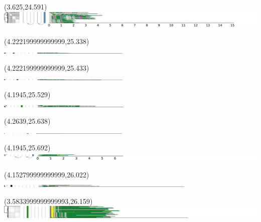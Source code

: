 \documentclass{article}
\begin{document}
\begin{textblock}{13}(3.625,24.591)\includegraphics{latex/figures/haplotypes-constrained/chr15-HG007.pdf}\end{textblock}
\begin{textblock}{13}(4.222199999999999,25.338)\includegraphics{latex/figures/haplotypes-constrained/16qtel_1-500K_1_12_12_rc-HG002.pdf}\end{textblock}
\begin{textblock}{13}(4.222199999999999,25.433)\includegraphics{latex/figures/haplotypes-constrained/16qtel_1-500K_1_12_12_rc-HG003.pdf}\end{textblock}
\begin{textblock}{13}(4.1945,25.529)\includegraphics{latex/figures/haplotypes-constrained/16qtel_1-500K_1_12_12_rc-HG004.pdf}\end{textblock}
\begin{textblock}{13}(4.2639,25.638)\includegraphics{latex/figures/haplotypes-constrained/16qtel_1-500K_1_12_12_rc-HG006.pdf}\end{textblock}
\begin{textblock}{13}(4.1945,25.692)\includegraphics{latex/figures/haplotypes-constrained/16qtel_1-500K_1_12_12_rc-HG007.pdf}\end{textblock}
\begin{textblock}{13}(4.152799999999999,26.022)\includegraphics{latex/figures/haplotypes-constrained/18qtel_1-500K_1_12_12_rc-HG001.pdf}\end{textblock}
\begin{textblock}{13}(3.5833999999999993,26.159)\includegraphics{latex/figures/haplotypes-constrained/18qtel_1-500K_1_12_12_rc-HG002.pdf}\end{textblock}
\end{document}
